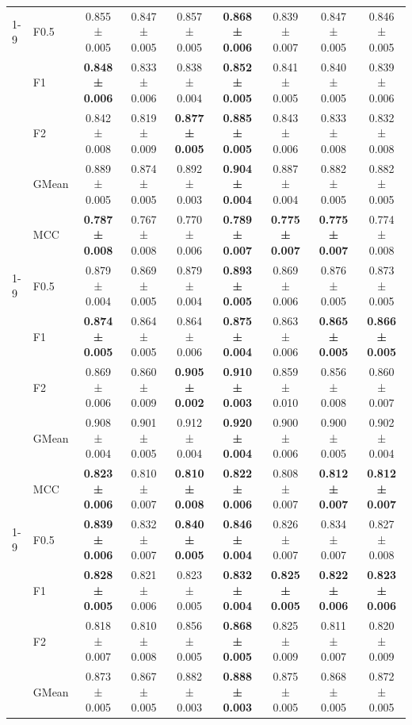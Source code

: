 \begin{table}[H]
{\begin{tabular}{llccccccc}
\cline{1-9}
\multirow[t]{5}{*}{RandomForest} & F0.5 & 0.855 ± 0.005 & 0.847 ± 0.005 & 0.857 ± 0.005 & \textbf{0.868 ± 0.006} & 0.839 ± 0.007 & 0.847 ± 0.005 & 0.846 ± 0.005 \\
 & F1 & \textbf{0.848 ± 0.006} & 0.833 ± 0.006 & 0.838 ± 0.004 & \textbf{0.852 ± 0.005} & 0.841 ± 0.005 & 0.840 ± 0.005 & 0.839 ± 0.006 \\
 & F2 & 0.842 ± 0.008 & 0.819 ± 0.009 & \textbf{0.877 ± 0.005} & \textbf{0.885 ± 0.005} & 0.843 ± 0.006 & 0.833 ± 0.008 & 0.832 ± 0.008 \\
 & GMean & 0.889 ± 0.005 & 0.874 ± 0.005 & 0.892 ± 0.003 & \textbf{0.904 ± 0.004} & 0.887 ± 0.004 & 0.882 ± 0.005 & 0.882 ± 0.005 \\
 & MCC & \textbf{0.787 ± 0.008} & 0.767 ± 0.008 & 0.770 ± 0.006 & \textbf{0.789 ± 0.007} & \textbf{0.775 ± 0.007} & \textbf{0.775 ± 0.007} & 0.774 ± 0.008 \\
\cline{1-9}
\multirow[t]{5}{*}{TabICL} & F0.5 & 0.879 ± 0.004 & 0.869 ± 0.005 & 0.879 ± 0.004 & \textbf{0.893 ± 0.005} & 0.869 ± 0.006 & 0.876 ± 0.005 & 0.873 ± 0.005 \\
 & F1 & \textbf{0.874 ± 0.005} & 0.864 ± 0.005 & 0.864 ± 0.006 & \textbf{0.875 ± 0.004} & 0.863 ± 0.006 & \textbf{0.865 ± 0.005} & \textbf{0.866 ± 0.005} \\
 & F2 & 0.869 ± 0.006 & 0.860 ± 0.009 & \textbf{0.905 ± 0.002} & \textbf{0.910 ± 0.003} & 0.859 ± 0.010 & 0.856 ± 0.008 & 0.860 ± 0.007 \\
 & GMean & 0.908 ± 0.004 & 0.901 ± 0.005 & 0.912 ± 0.004 & \textbf{0.920 ± 0.004} & 0.900 ± 0.006 & 0.900 ± 0.005 & 0.902 ± 0.004 \\
 & MCC & \textbf{0.823 ± 0.006} & 0.810 ± 0.007 & \textbf{0.810 ± 0.008} & \textbf{0.822 ± 0.006} & 0.808 ± 0.007 & \textbf{0.812 ± 0.007} & \textbf{0.812 ± 0.007} \\
\cline{1-9}
\multirow[t]{5}{*}{TabM} & F0.5 & \textbf{0.839 ± 0.006} & 0.832 ± 0.007 & \textbf{0.840 ± 0.005} & \textbf{0.846 ± 0.004} & 0.826 ± 0.007 & 0.834 ± 0.007 & 0.827 ± 0.008 \\
 & F1 & \textbf{0.828 ± 0.005} & 0.821 ± 0.006 & 0.823 ± 0.005 & \textbf{0.832 ± 0.004} & \textbf{0.825 ± 0.005} & \textbf{0.822 ± 0.006} & \textbf{0.823 ± 0.006} \\
 & F2 & 0.818 ± 0.007 & 0.810 ± 0.008 & 0.856 ± 0.005 & \textbf{0.868 ± 0.005} & 0.825 ± 0.009 & 0.811 ± 0.007 & 0.820 ± 0.009 \\
 & GMean & 0.873 ± 0.005 & 0.867 ± 0.005 & 0.882 ± 0.003 & \textbf{0.888 ± 0.003} & 0.875 ± 0.005 & 0.868 ± 0.005 & 0.872 ± 0.005 \\

\end{tabular}}
\end{table}
